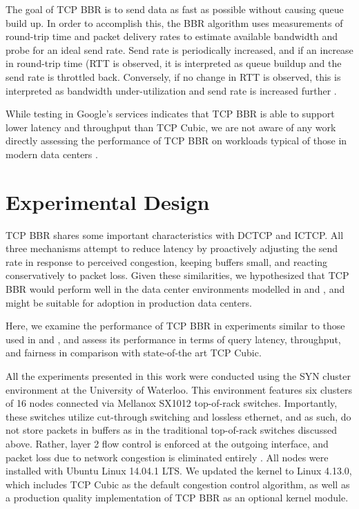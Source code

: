 \documentclass[letterpaper,twocolumn,10pt]{article}
\begin{document}
The goal of TCP BBR is to send data as fast as possible without causing queue build up. In order to accomplish this, the BBR algorithm uses measurements of round-trip time and packet delivery rates to estimate available bandwidth and probe for an ideal send rate. Send rate is periodically increased, and if an increase in round-trip time (RTT is observed, it is interpreted as queue buildup and the send rate is throttled back. Conversely, if no change in RTT is observed, this is interpreted as bandwidth under-utilization and send rate is increased further \cite{cardwell_bbr:_2016}.

While testing in Google's services indicates that TCP BBR is able to support lower latency and throughput than TCP Cubic, we are not aware of any work directly assessing the performance of TCP BBR on workloads typical of those in modern data centers \cite{cardwell_tcp_2017, cardwell_bbr:_2016}. 

\section{Experimental Design}

TCP BBR shares some important characteristics with DCTCP and ICTCP. All three mechanisms attempt to reduce latency by proactively adjusting the send rate in response to perceived congestion, keeping buffers small, and reacting conservatively to packet loss. Given these similarities, we hypothesized that TCP BBR would perform well in the data center environments modelled in \cite{alizadeh_data_2010} and \cite{wu_ictcp:_2013}, and might be suitable for adoption in production data centers. 

Here, we examine the performance of TCP BBR in experiments similar to those used in \cite{alizadeh_data_2010} and \cite{wu_ictcp:_2013}, and assess its performance in terms of query latency, throughput, and fairness in comparison with state-of-the art TCP Cubic.

All the experiments presented in this work were conducted using the SYN cluster environment at the University of Waterloo. This environment features six clusters of 16 nodes connected via Mellanox SX1012 top-of-rack switches. Importantly, these switches utilize cut-through switching and lossless ethernet, and as such, do not store packets in buffers as in the traditional top-of-rack switches discussed above. Rather, layer 2 flow control is enforced at the outgoing interface, and packet loss due to network congestion is eliminated entirely \cite{noauthor_mellanox_sx1012, noauthor_mellanox_sx1012_pdf}. All nodes were installed with Ubuntu Linux 14.04.1 LTS. We updated the kernel to Linux 4.13.0, which includes TCP Cubic as the default congestion control algorithm, as well as a production quality implementation of TCP BBR as an optional kernel module.
\end{document}
